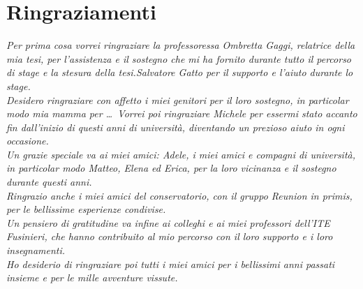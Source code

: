 \cleardoublepage
{}
{}

\begingroup
\let\clearpage\relax
\let\cleardoublepage\relax
\let\cleardoublepage\relax

\chapter*{Ringraziamenti}
\textit{Per prima cosa vorrei ringraziare la professoressa Ombretta Gaggi, relatrice della mia tesi, per l’assistenza e il sostegno che mi ha fornito durante tutto il percorso di stage e la stesura della tesi.Salvatore Gatto per il supporto e l'aiuto durante lo stage.\\
Desidero ringraziare con affetto i miei genitori per il loro sostegno, in particolar modo mia mamma per …\
Vorrei poi ringraziare Michele per essermi stato accanto fin dall'inizio di questi anni di università, diventando un prezioso aiuto in ogni occasione.\\
Un grazie speciale va ai miei amici: Adele, i miei amici e compagni di università, in particolar modo Matteo, Elena ed Erica, per la loro vicinanza e il sostegno durante questi anni.\\
Ringrazio anche i miei amici del conservatorio, con il gruppo Reunion in primis, per le bellissime esperienze condivise.\\
Un pensiero di gratitudine va infine ai colleghi e ai miei professori dell'ITE Fusinieri, che hanno contribuito al mio percorso con il loro supporto e i loro insegnamenti.\\
Ho desiderio di ringraziare poi tutti i miei amici per i bellissimi anni passati insieme e per le mille avventure vissute.}

\vspace{0.75cm}

\noindent{\myLocation, \myTime}
\hfill \textit{\myName}

\endgroup
